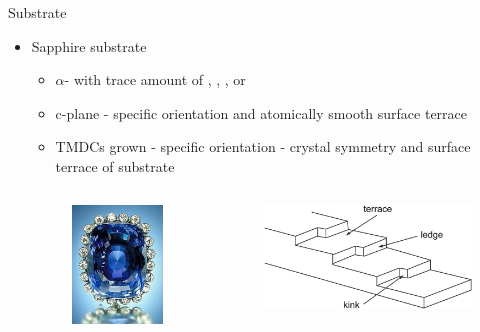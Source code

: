 \documentclass{beamer}
\begin{document}
\begin{frame}{Substrate}
    \begin{itemize}
        \item Sapphire substrate
        \begin{itemize}
            \item $\alpha$- with trace amount of , , ,  or 
            \item c-plane - specific orientation and atomically smooth surface terrace
            \item TMDCs grown - specific orientation - crystal symmetry and surface terrace of substrate
        \end{itemize}
    \begin{columns}
    \begin{figure}
        \includegraphics[scale = 0.3]{330px-Logan_Sapphire_SI.jpg}
    \end{figure}
    \begin{figure}
        \includegraphics[scale = 0.7]{surface terrace.png}
    \end{figure}
    \end{columns}
    \end{itemize}
\end{frame}
\end{document}

